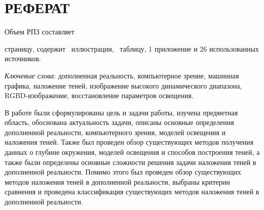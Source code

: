 \chapter*{РЕФЕРАТ}

Объем РПЗ составляет \begin{NoHyper}\pageref{LastPage}\end{NoHyper} страницу, содержит \totfig~иллюстрации, \tottab~таблицу, 1 приложение и 26 использованных источников.

\textit{Ключевые слова}: дополненная реальность, компьютерное зрение, машинная графика, наложение теней, изображение высокого динамического диапазона, RGBD-изображение, восстановление параметров освещения.

В работе были сформулированы цель и задачи работы, изучена предметная область, обоснована актуальность задачи, описаны основные определения дополненной реальности, компьютерного зрения, моделей освещения и наложения теней. Также был проведен обзор существующих методов получения данных о глубине окружения, моделей освещения и способов построения теней, а также были определены основные сложности решения задачи наложения теней в дополненной реальности. Помимо этого был проведен обзор существующих методов наложения теней в дополненной реальности, выбраны критерии сравнения и проведена классификация существующих методов наложения теней в дополненной реальности.